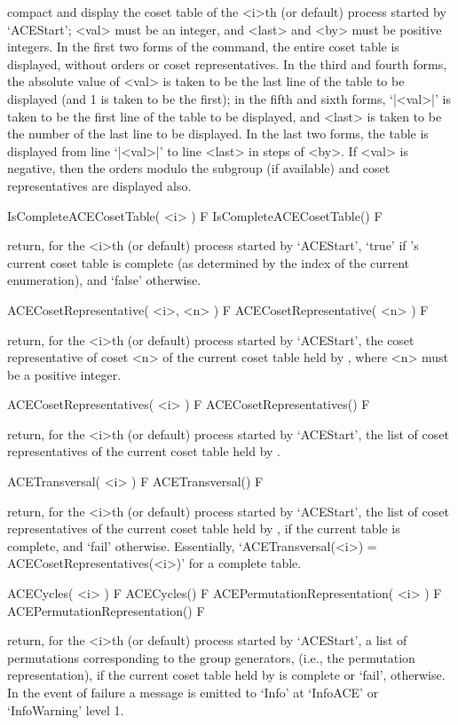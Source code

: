 compact and display the coset table of the <i>th (or default)  process
started by `ACEStart'; <val> must be an integer, and <last>  and  <by>
must be positive integers. In the first two forms of the command,  the
entire  coset  table   is   displayed,   without   orders   or   coset
representatives. In the third and fourth forms, the absolute value  of
<val> is taken to be the last line of the table to be displayed (and 1
is taken to be the first); in the fifth and sixth forms, `|<val>|'  is
taken to be the first line of the table to be displayed, and <last> is
taken to be the number of the last line to be displayed. In  the  last
two forms, the table is displayed from line `|<val>|' to  line  <last>
in steps of <by>. If <val> is negative, then  the  orders  modulo  the
subgroup (if available) and coset representatives are displayed also.

\>IsCompleteACECosetTable( <i> ) F
\>IsCompleteACECosetTable() F

return, for the <i>th (or  default)  process  started  by  `ACEStart',
`true' if {\ACE}'s current coset table is complete (as  determined  by
the index of the current enumeration), and `false' otherwise.

\>ACECosetRepresentative( <i>, <n> ) F
\>ACECosetRepresentative( <n> ) F

return, for the <i>th (or default) process started by `ACEStart',  the
coset representative of coset <n> of the current coset table  held  by
{\ACE}, where <n> must be a positive integer.

\>ACECosetRepresentatives( <i> ) F
\>ACECosetRepresentatives() F

return, for the <i>th (or default) process started by `ACEStart',  the
list of coset representatives of  the  current  coset  table  held  by
{\ACE}.

\>ACETransversal( <i> ) F
\>ACETransversal() F

return, for the <i>th (or default) process started by `ACEStart',  the
list of coset representatives of  the  current  coset  table  held  by
{\ACE}, if the  current  table  is  complete,  and  `fail'  otherwise.
Essentially, `ACETransversal(<i>) = ACECosetRepresentatives(<i>)'  for
a complete table.

\>ACECycles( <i> ) F
\>ACECycles() F
\>ACEPermutationRepresentation( <i> ) F
\>ACEPermutationRepresentation() F

return, for the <i>th (or default) process started  by  `ACEStart',  a
list of permutations corresponding to the group generators, (i.e., the
permutation representation), if the current coset table held by {\ACE}
is complete or `fail', otherwise. In the event of failure a message is
emitted to `Info' at `InfoACE' or `InfoWarning' level 1.

